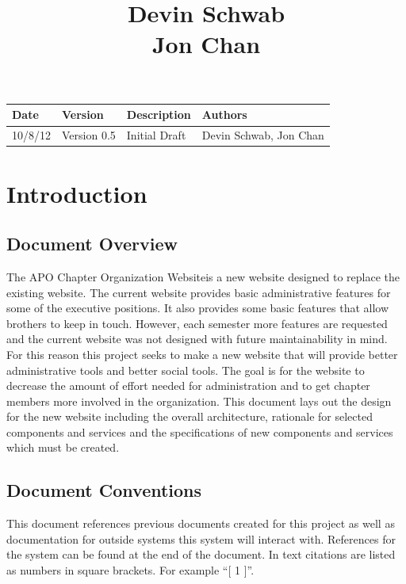 \documentclass{article}
\title{\projName \\ \vspace{10 mm}
\docName \\ \vspace{10 mm}
Devin Schwab\\
Jon Chan}
\date{\docDate}
\newcommand{\projName}{APO Chapter Organization Website}
\begin{document}


\maketitle

\newpage

\begin{longtable}{|l|l|l|l|}
\hline
{\bf Date} & {\bf Version} & {\bf Description} & {\bf Authors} \\ \hline
10/8/12 & Version 0.5 & Initial Draft & Devin Schwab, Jon Chan \\ \hline
\end{longtable}

\newpage

\tableofcontents
\listoffigures

\newpage

\section{Introduction}

\subsection{Document Overview}
The \projName is a new website designed to replace the existing website.
The current website provides basic administrative features for some of the executive positions.
It also provides some basic features that allow brothers to keep in touch. However, each semester
more features are requested and the current website was not designed with future maintainability
in mind. For this reason this project seeks to make a new website that will provide better
administrative tools and better social tools. The goal is for the website to decrease the amount of effort
needed for administration and to get chapter members more involved in the organization. This document lays out
the design for the new website including the overall architecture, rationale for selected components and
services and the specifications of new components and services which must be created.

\subsection{Document Conventions}
This document references previous documents created for this project as well as documentation
for outside systems this system will interact with. References for the system can be found at the end of the document.
In text citations are listed as numbers in square brackets. For example ``[ 1 ]''. 
\end{document}
